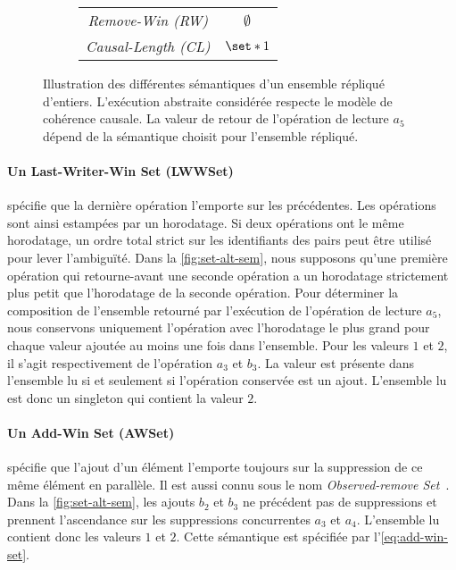 \begin{figure}[htb]
\begin{subfigure}{\linewidth}
\begin{tabular}{cc}
        \emph{Remove-Win (RW)} & $\emptyset$ \\
        \emph{Causal-Length (CL)} & $\set*{1}$ \\
    \end{tabular}
    \caption{}\label{fig:set-alt-sem-2}
\end{subfigure}
\caption[Sémantiques d'un ensemble répliqué]{Illustration des différentes sémantiques d'un ensemble répliqué d'entiers.
 L'exécution abstraite considérée respecte le modèle de cohérence causale.
 La valeur de retour de l'opération de lecture $a_5$ dépend de la sémantique choisit pour l'ensemble répliqué.
}\label{fig:set-alt-sem}
\end{figure}

\paragraph{Un Last-Writer-Win Set (LWWSet)~\autocite{shapiro2011_comprehensive}} spécifie que la dernière opération l'emporte sur les précédentes. Les opérations sont ainsi estampées par un horodatage.
Si deux opérations ont le même horodatage, un ordre total strict sur les identifiants des pairs peut être utilisé pour lever l'ambiguïté.
Dans la \autoref{fig:set-alt-sem}, nous supposons qu'une première opération qui retourne-avant une seconde opération a un horodatage strictement plus petit que l'horodatage de la seconde opération.
Pour déterminer la composition de l'ensemble retourné par l'exécution de l'opération de lecture $a_5$, nous conservons uniquement l'opération avec l'horodatage le plus grand pour chaque valeur ajoutée au moins une fois dans l'ensemble.
Pour les valeurs $1$ et $2$, il s'agit respectivement de l'opération $a_3$ et $b_3$.
La valeur est présente dans l'ensemble lu si et seulement si l'opération conservée est un ajout.
L'ensemble lu est donc un singleton qui contient la valeur $2$.

\paragraph{Un Add-Win Set (AWSet)~\autocite{shapiro_2011_crdt}} spécifie que l'ajout d'un élément l'emporte toujours sur la suppression de ce même élément en parallèle.
Il est aussi connu sous le nom \emph{Observed-remove Set}~\autocite{shapiro_2011_crdt}.
Dans la \autoref{fig:set-alt-sem}, les ajouts $b_2$ et $b_3$ ne précédent pas de suppressions et prennent l'ascendance sur les suppressions concurrentes $a_3$ et $a_4$.
L'ensemble lu contient donc les valeurs $1$ et $2$.
Cette sémantique est spécifiée par l'\autoref{eq:add-win-set}.

